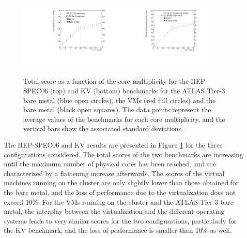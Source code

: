 \begin{figure}[htbp]
\centering
\includegraphics[width=0.44\textwidth]{benchmark-hepspec06-total.pdf}
\includegraphics[width=0.44\textwidth]{kv-BFG-BM-NEMO-VM-NEMO-BM-total.pdf} 
\caption{Total score as a function of the core multiplicity for the HEP-SPEC06 (top) and KV (bottom) benchmarks for the ATLAS Tier-3 bare metal (blue open circles),
the \NEMO VMs (red full circles) and the \NEMO bare metal (black open squares). The data points represent the average values of the benchmarks for each core multiplicity,
and the vertical bars show the associated standard deviations.}
\label{bmk-total}
\end{figure}

The HEP-SPEC06 and KV results are presented in Figure \ref{bmk-total} for the three configurations considered.
The total scores of the two benchmarks are increasing until the maximum number of physical cores has been reached, and are characterized by a flattening increase afterwards.
The scores of the virtual machines running on the \NEMO cluster are only slightly lower than those obtained for the \NEMO bare metal, and the loss of performance
due to the virtualization does not exceed 10$\%$.
For the VMs running on the \NEMO cluster and the ATLAS Tier-3 bare metal, the interplay between the virtualization and the different operating systems leads to very similar scores
for the two configurations, particularly for the KV benchmark, and the loss of performance is smaller than 10$\%$ as well.



